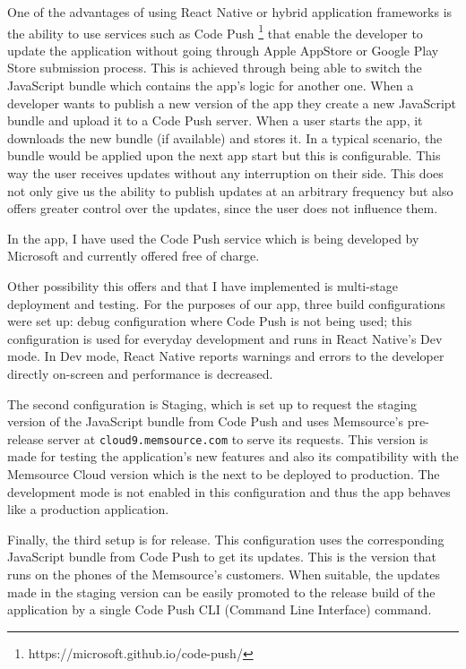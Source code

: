 One of the advantages of using React Native or hybrid application frameworks is the ability to use services such as Code Push \footnote{https://microsoft.github.io/code-push/} that enable the developer to update the application without going through Apple AppStore or Google Play Store submission process. This is achieved through being able to switch the JavaScript bundle which contains the app’s logic for another one. When a developer wants to publish a new version of the app they create a new JavaScript bundle and upload it to a Code Push server. 
When a user starts the app, it downloads the new bundle (if available) and stores it. In a typical scenario, the bundle would be applied upon the next app start but this is configurable. This way the user receives updates without any interruption on their side. This does not only give us the ability to publish updates at an arbitrary frequency but also offers greater control over the updates, since the user does not influence them.


In the app, I have used the Code Push service which is being developed by Microsoft and currently offered free of charge. 


Other possibility this offers and that I have implemented is multi-stage deployment and testing. For the purposes of our app, three build configurations were set up: debug configuration where Code Push is not being used; this configuration is used for everyday development and runs in React Native’s Dev mode. In Dev mode, React Native reports warnings and errors to the developer directly on-screen and performance is decreased.

The second configuration is Staging, which is set up to request the staging version of the JavaScript bundle from Code Push and uses Memsource’s pre-release server at \texttt{cloud9.memsource.com} to serve its requests. This version is made for testing the application's new features and also its compatibility with the Memsource Cloud version which is the next to be deployed to production. The development mode is not enabled in this configuration and thus the app behaves like a production application. 


Finally, the third setup is for release. This configuration uses the corresponding JavaScript bundle from Code Push to get its updates. This is the version that runs on the phones of the Memsource’s customers. When suitable, the updates made in the staging version can be easily promoted to the release build of the application by a single Code Push CLI (Command Line Interface) command.


